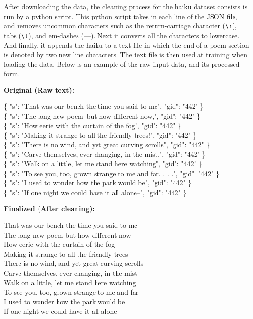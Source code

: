 \documentclass{article} %
\begin{document}
After downloading the data, the cleaning process for the haiku dataset consists is run by a python script.
This python script takes in each line of the JSON file, and removes uncommon characters such as the return-carriage character (\texttt{\textbackslash r}), tabs (\texttt{\textbackslash t}), and em-dashes (—).
Next it converts all the characters to lowercase.
And finally, it appends the haiku to a text file in which the end of a poem section is denoted by two new line characters.
The text file is then used at training when loading the data.
Below is an example of the raw input data, and its processed form.



\begin{multicols}{2}

  \textbf{Original (Raw text):} \par
\{ "s": "That was our bench the time you said to me", "gid": "442" \} \\
\{ "s": "The long new poem--but how different now,", "gid": "442" \} \\
\{ "s": "How eerie with the curtain of the fog", "gid": "442" \} \\
\{ "s": "Making it strange to all the friendly trees!", "gid": "442" \} \\
\{ "s": "There is no wind, and yet great curving scrolls", "gid": "442" \} \\
\{ "s": "Carve themselves, ever changing, in the mist.", "gid": "442" \} \\
\{ "s": "Walk on a little, let me stand here watching", "gid": "442" \} \\
\{ "s": "To see you, too, grown strange to me and far. . . .", "gid": "442" \} \\
\{ "s": "I used to wonder how the park would be", "gid": "442" \} \\
\{ "s": "If one night we could have it all alone--", "gid": "442" \} \\

  \columnbreak

  \raggedleft
  \textbf{Finalized (After cleaning):} \par

  \raggedleft
That was our bench the time you said to me \\
The long new poem but how different now \\
How eerie with the curtain of the fog \\
Making it strange to all the friendly trees \\
There is no wind, and yet great curving scrolls \\
Carve themselves, ever changing, in the mist \\
Walk on a little, let me stand here watching \\
To see you, too, grown strange to me and far \\
I used to wonder how the park would be \\
If one night we could have it all alone


\end{multicols}
\end{document}
